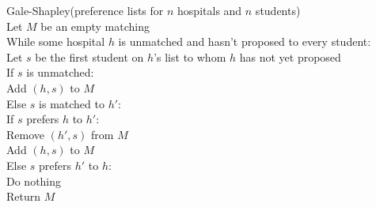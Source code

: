 \documentclass[11pt]{article}
\begin{document}
    \begin{algo}
    Gale-Shapley(preference lists for $n$ hospitals and $n$ students)\+\\
    Let $M$ be an empty matching\\
    While some hospital $h$ is unmatched and hasn't proposed to every student:\+ \\
        Let $s$ be the first student on $h$'s list to whom $h$ has not yet proposed\\
        If $s$ is unmatched:\+\\
            Add $(h,s)$ to $M$\-\\
        Else $s$ is matched to $h'$:\+\\
            If $s$ prefers $h$ to $h'$:\+\\
                Remove $(h',s)$ from $M$\\
                Add $(h,s)$ to $M$\-\\
            Else $s$ prefers $h'$ to $h$:\+\\
                Do nothing\-\-\-\\
    Return $M$\\
    \end{algo}
\end{document}
